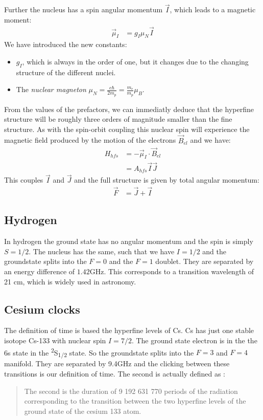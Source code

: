 \documentclass[10pt]{article}
\let\cite\citep
\providecommand\citep{\cite}
\begin{document}
Further the nucleus has a spin angular momentum $\vec{I}$, which leads to a magnetic moment:
\begin{align}
\vec{\mu}_I&= g_I \mu_N \vec{I}
\end{align}
We have introduced the new constants:
\begin{itemize}
\item $g_I$, which is always in the order of one, but it changes due to the changing structure of the different nuclei.
\item The \textit{nuclear magneton} $\mu_N = \frac{e\hbar}{2m_p}= \frac{m_e}{m_p}\mu_B$.
\end{itemize}
From the values of the prefactors, we can immediatly deduce that the hyperfine structure will be roughly three orders of magnitude smaller than the fine structure. As with the spin-orbit coupling this nuclear spin will experience the magnetic field produced by the motion of the electrons $\vec{B}_{el}$ and we have:
\begin{align}
H_{hfs} &= -\vec{\mu}_I \cdot \vec{B}_{el}\\
&= A_{hfs}\vec{I}\vec{J}
\end{align}
This couples $\vec{I}$ and $\vec{J}$ and the full structure is given by total angular momentum:
\begin{align}
\vec{F} &= \vec{J} + \vec{I}
\end{align}
 
\subsection{Hydrogen}
In hydrogen the ground state has no angular momentum and the spin is simply $S=1/2$. The nucleus has the same, such that we have $I=1/2$ and the groundstate splits into the $F=0$ and the $F=1$ doublet. They are separated by an energy difference of $1.42$GHz. This corresponds to a transition wavelength of 21 cm, which is widely used in astronomy.
\subsection{Cesium clocks}
The definition of time is based the hyperfine levels of Cs. Cs has just one stable isotope Cs-133 with nuclear spin $I=7/2$. The ground state electron is in the the 6s state in the \textsuperscript{2}S\textsubscript{1/2} state. So the groundstate splits into the $F=3$ and $F=4$ manifold. They are separated by 9.4GHz and the clicking between these transitions is our definition of time. The second is actually defined as \cite{units}:
\begin{quote}
The second is the duration of 9 192 631 770 periods of the radiation corresponding to the transition between the two hyperfine levels of the ground state of the cesium 133 atom.
\end{quote}
\end{document}
